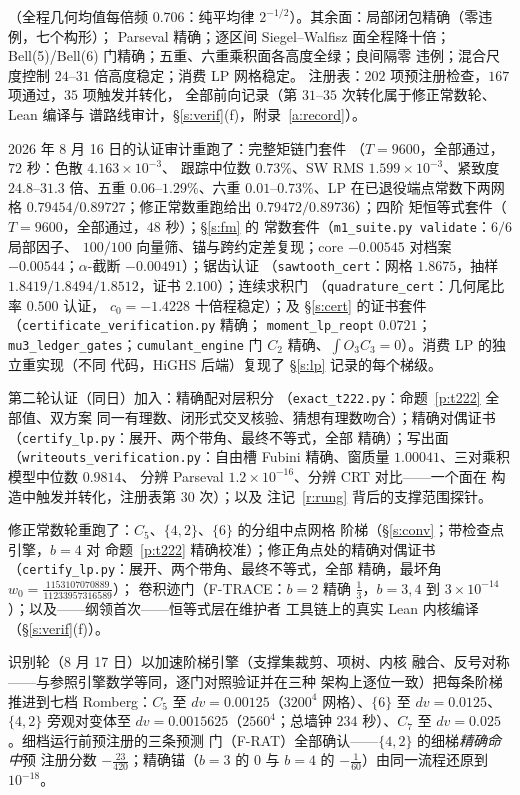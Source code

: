 \documentclass[11pt]{article}
\numberwithin{equation}{section}
\theoremstyle{definition}
\theoremstyle{remark}
\begin{document}
\noindent（全程几何均值每倍频 $0.706$：纯平均律
$2^{-1/2}$）。其余面：局部闭包精确（零违例，七个构形）；
Parseval 精确；逐区间 Siegel--Walfisz 面全程降十倍；
Bell(5)/Bell(6) 门精确；五重、六重乘积面各高度全绿；良间隔零
违例；混合尺度控制 $24$--$31$ 倍高度稳定；消费 LP 网格稳定。
注册表：$202$ 项预注册检查，$167$ 项通过，$35$ 项触发并转化，
全部前向记录（第 $31$--$35$ 次转化属于修正常数轮、Lean 编译与
谱路线审计，\S\ref{s:verif}(f)，附录~\ref{a:record}）。

2026 年 8 月 16 日的认证审计重跑了：完整矩链门套件
（$T=9600$，全部通过，$72$ 秒：色散 $4.163\times10^{-3}$、
跟踪中位数 $0.73\%$、SW RMS $1.599\times10^{-3}$、紧致度
$24.8$--$31.3$ 倍、五重 $0.06$--$1.29\%$、六重
$0.01$--$0.73\%$、LP 在已退役端点常数下两网格
$0.79454/0.89727$；修正常数重跑给出 $0.79472/0.89736$）；四阶
矩恒等式套件（$T=9600$，全部通过，$48$ 秒）；\S\ref{s:fm} 的
常数套件（\texttt{m1\_suite.py validate}：$6/6$ 局部因子、
$100/100$ 向量筛、锚与跨约定差复现；core $-0.00545$ 对档案
$-0.00544$；$\alpha$-截断 $-0.00491$）；锯齿认证
（\texttt{sawtooth\_cert}：网格 $1.8675$，抽样
$1.8419/1.8494/1.8512$，证书 $2.100$）；连续求积门
（\texttt{quadrature\_cert}：几何尾比率 $0.500$ 认证，
$c_0=-1.4228$ 十倍程稳定）；及 \S\ref{s:cert} 的证书套件
（\texttt{certificate\_verification.py} 精确；
\texttt{moment\_lp\_reopt} $0.0721$；
\texttt{mu3\_ledger\_gates}；\texttt{cumulant\_engine} 门
$C_2$ 精确、$\int O_3C_3=0$）。消费 LP 的独立重实现（不同
代码，HiGHS 后端）复现了 \S\ref{s:lp} 记录的每个梯级。

第二轮认证（同日）加入：精确配对层积分
（\texttt{exact\_t222.py}：命题~\ref{p:t222} 全部值、双方案
同一有理数、闭形式交叉核验、猜想有理数吻合）；精确对偶证书
（\texttt{certify\_lp.py}：展开、两个带角、最终不等式，全部
精确）；写出面（\texttt{writeouts\_verification.py}：自由槽
Fubini 精确、窗质量 $1.00041$、三对乘积模型中位数 $0.9814$、
分辨 Parseval $1.2\times10^{-16}$、分辨 CRT 对比——一个面在
构造中触发并转化，注册表第 $30$ 次）；以及
注记~\ref{r:rung} 背后的支撑范围探针。

修正常数轮重跑了：$C_5$、$\{4,2\}$、$\{6\}$ 的分组中点网格
阶梯（\S\ref{s:conv}；带检查点引擎，$b=4$ 对
命题~\ref{p:t222} 精确校准）；修正角点处的精确对偶证书
（\texttt{certify\_lp.py}：展开、两个带角、最终不等式，全部
精确，最坏角 $w_0=\tfrac{1153107070889}{11233957316589}$）；
卷积迹门（F-TRACE：$b=2$ 精确 $\tfrac13$，$b=3,4$ 到
$3\times10^{-14}$）；以及——纲领首次——恒等式层在维护者
工具链上的真实 Lean 内核编译（\S\ref{s:verif}(f)）。

识别轮（8 月 17 日）以加速阶梯引擎（支撑集裁剪、项树、内核
融合、反号对称——与参照引擎数学等同，逐门对照验证并在三种
架构上逐位一致）把每条阶梯推进到七档 Romberg：$C_5$ 至
$dv=0.00125$（$3200^4$ 网格）、$\{6\}$ 至 $dv=0.0125$、
$\{4,2\}$ 旁观对变体至 $dv=0.0015625$（$2560^4$；总墙钟
$234$ 秒）、$C_7$ 至 $dv=0.025$。细档运行前预注册的三条预测
门（F-RAT）全部确认——$\{4,2\}$ 的细梯\emph{精确命中}预
注册分数 $-\tfrac{23}{420}$；精确锚（$b=3$ 的 $0$ 与 $b=4$
的 $-\tfrac1{60}$）由同一流程还原到 $10^{-18}$。
\end{document}
